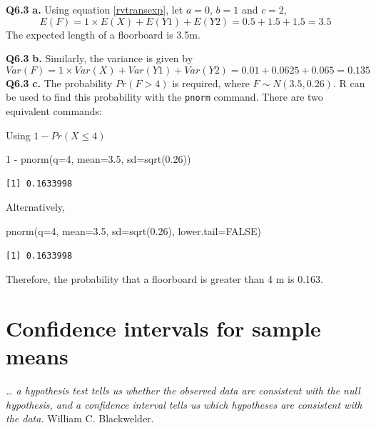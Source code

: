 \documentclass[
  oneside]{krantz}
\newenvironment{Shaded}{\begin{snugshade}}{\end{snugshade}}
\newcommand{\AttributeTok}[1]{\textcolor[rgb]{0.77,0.63,0.00}{#1}}
\newcommand{\ConstantTok}[1]{\textcolor[rgb]{0.00,0.00,0.00}{#1}}
\newcommand{\DecValTok}[1]{\textcolor[rgb]{0.00,0.00,0.81}{#1}}
\newcommand{\FloatTok}[1]{\textcolor[rgb]{0.00,0.00,0.81}{#1}}
\newcommand{\FunctionTok}[1]{\textcolor[rgb]{0.00,0.00,0.00}{#1}}
\newcommand{\NormalTok}[1]{#1}
\newcommand{\SpecialCharTok}[1]{\textcolor[rgb]{0.00,0.00,0.00}{#1}}
\begin{document}
\textbf{Q6.3} \textbf{a.} Using equation \ref{rvtransexp}, let \(a=0\), \(b=1\) and \(c=2\),
\[E(F) = 1 \times E(X) + E(Y1) + E(Y2) = 0.5 + 1.5 + 1.5 = 3.5\]
The expected length of a floorboard is 3.5m.

\textbf{Q6.3} \textbf{b.} Similarly, the variance is given by
\[Var(F) = 1 \times Var(X) + Var(Y1) + Var(Y2) = 0.01 + 0.0625 + 0.065 = 0.135\]
\textbf{Q6.3} \textbf{c.} The probability \(Pr(F > 4)\) is required, where \(F \sim N(3.5, 0.26)\). R can be used to find this probability with the \texttt{pnorm} command. There are two equivalent commands:

Using \(1 - Pr(X \le 4)\)

\begin{Shaded}
\begin{Highlighting}[]
\DecValTok{1} \SpecialCharTok{{-}} \FunctionTok{pnorm}\NormalTok{(}\AttributeTok{q=}\DecValTok{4}\NormalTok{, }\AttributeTok{mean=}\FloatTok{3.5}\NormalTok{, }\AttributeTok{sd=}\FunctionTok{sqrt}\NormalTok{(}\FloatTok{0.26}\NormalTok{))}
\end{Highlighting}
\end{Shaded}

\begin{verbatim}
[1] 0.1633998
\end{verbatim}

Alternatively,

\begin{Shaded}
\begin{Highlighting}[]
\FunctionTok{pnorm}\NormalTok{(}\AttributeTok{q=}\DecValTok{4}\NormalTok{, }\AttributeTok{mean=}\FloatTok{3.5}\NormalTok{, }\AttributeTok{sd=}\FunctionTok{sqrt}\NormalTok{(}\FloatTok{0.26}\NormalTok{), }\AttributeTok{lower.tail=}\ConstantTok{FALSE}\NormalTok{)}
\end{Highlighting}
\end{Shaded}

\begin{verbatim}
[1] 0.1633998
\end{verbatim}

Therefore, the probability that a floorboard is greater than 4 m is 0.163.

\hypertarget{CIformean}{%
\chapter{Confidence intervals for sample means}\label{CIformean}}

\emph{\ldots{} a hypothesis test tells us whether the observed data are consistent with the null hypothesis, and a confidence interval tells us which hypotheses are consistent with the data.} William C. Blackwelder.
\end{document}
